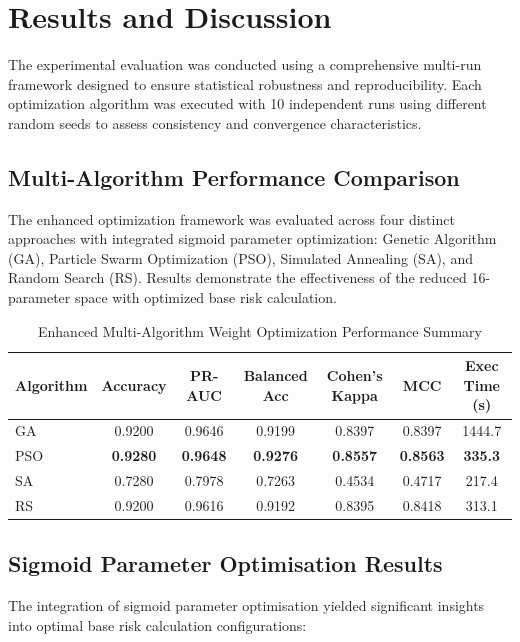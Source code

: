 \section{Results and Discussion}


The experimental evaluation was conducted using a comprehensive multi-run framework designed to ensure statistical robustness and reproducibility. Each optimization algorithm was executed with 10 independent runs using different random seeds to assess consistency and convergence characteristics.

\subsection{Multi-Algorithm Performance Comparison}

The enhanced optimization framework was evaluated across four distinct approaches with integrated sigmoid parameter optimization: Genetic Algorithm (GA), Particle Swarm Optimization (PSO), Simulated Annealing (SA), and Random Search (RS). Results demonstrate the effectiveness of the reduced 16-parameter space with optimized base risk calculation.

\begin{table}[H]
\centering
\caption{Enhanced Multi-Algorithm Weight Optimization Performance Summary}
\label{tab:algorithm_performance}
\begin{tabular}{lcccccc}
\toprule
\textbf{Algorithm} & \textbf{Accuracy} & \textbf{PR-AUC} & \textbf{Balanced Acc} & \textbf{Cohen's Kappa} & \textbf{MCC} & \textbf{Exec Time (s)} \\
\midrule
GA & 0.9200 & 0.9646 & 0.9199 & 0.8397 & 0.8397 & 1444.7 \\
PSO & \textbf{0.9280} & \textbf{0.9648} & \textbf{0.9276} & \textbf{0.8557} & \textbf{0.8563} & \textbf{335.3} \\
SA & 0.7280 & 0.7978 & 0.7263 & 0.4534 & 0.4717 & 217.4 \\
RS & 0.9200 & 0.9616 & 0.9192 & 0.8395 & 0.8418 & 313.1 \\
\bottomrule
\end{tabular}
\end{table}

\subsection{Sigmoid Parameter Optimisation Results}

The integration of sigmoid parameter optimisation yielded significant insights into optimal base risk calculation configurations:

